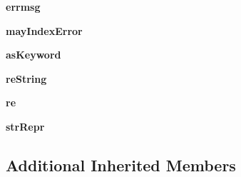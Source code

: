 \begin{DoxyCompactItemize}
{\bfseries errmsg}
\item 
\mbox{\label{classsetuptools_1_1__vendor_1_1pyparsing_1_1_word_a6594dee81b74cae16fd94bc81e0dc1d5}} 
{\bfseries may\+Index\+Error}
\item 
\mbox{\label{classsetuptools_1_1__vendor_1_1pyparsing_1_1_word_ace9c177ced3a1a96c0da37052f558dc5}} 
{\bfseries as\+Keyword}
\item 
\mbox{\label{classsetuptools_1_1__vendor_1_1pyparsing_1_1_word_a6571e56d895cf39cbaa04ddc3faa6be2}} 
{\bfseries re\+String}
\item 
\mbox{\label{classsetuptools_1_1__vendor_1_1pyparsing_1_1_word_a2d1cb697fff2c4f80d9413ffa47283f5}} 
{\bfseries re}
\item 
\mbox{\label{classsetuptools_1_1__vendor_1_1pyparsing_1_1_word_ade93cc7b82dea811353fada4335f3744}} 
{\bfseries str\+Repr}
\end{DoxyCompactItemize}
\subsection*{Additional Inherited Members}


